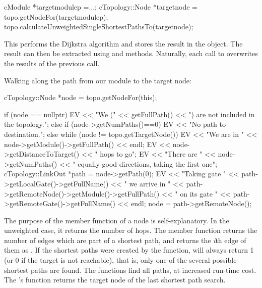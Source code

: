 \begin{cpp}
cModule *targetmodulep =...;
cTopology::Node *targetnode = topo.getNodeFor(targetmodulep);
topo.calculateUnweightedSingleShortestPathsTo(targetnode);
\end{cpp}


This performs the Dijkstra algorithm and
stores the result in the  object. The result can
then be extracted using  and
 methods.  Naturally, each call to
 overwrites the results of
the previous call.

Walking along the path from our module to the target node:

\begin{cpp}
cTopology::Node *node = topo.getNodeFor(this);

if (node == nullptr) {
  EV << "We (" << getFullPath() << ") are not included in the topology.\n";
}
else if (node->getNumPaths()==0) {
  EV << "No path to destination.\n";
}
else {
  while (node != topo.getTargetNode()) {
    EV << "We are in " << node->getModule()->getFullPath() << endl;
    EV << node->getDistanceToTarget() << " hops to go\n";
    EV << "There are " << node->getNumPaths()
       << " equally good directions, taking the first one\n";
    cTopology::LinkOut *path = node->getPath(0);
    EV << "Taking gate " << path->getLocalGate()->getFullName()
       << " we arrive in " << path->getRemoteNode()->getModule()->getFullPath()
       << " on its gate " << path->getRemoteGate()->getFullName() << endl;
    node = path->getRemoteNode();
  }
}
\end{cpp}

The purpose of the  member function of a
node is self-explanatory. In the unweighted case, it returns the
number of hops. The  member function returns the number
of edges which are part of a shortest path, and
 returns the \textit{i}th edge of them as
. If the shortest paths were created by the
 function,
 will always return 1 (or 0 if the target is not
reachable), that is, only one of the several possible shortest paths
are found.  The
 functions
find all paths, at increased run-time cost. The 's
 function returns the target node of the last
shortest path search.

